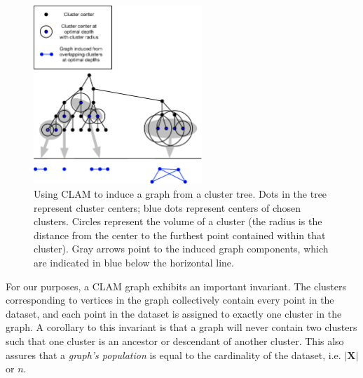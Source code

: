 \begin{figure}[ht!]
    \centering
    \includegraphics[width=2.5in]{images/tree-graph.pdf}
    \caption{Using CLAM to induce a graph from a cluster tree.
        Dots in the tree represent cluster centers;
        blue dots represent centers of chosen clusters.
        Circles represent the volume of a cluster (the radius is the distance from the center to the furthest point contained within that cluster).
        Gray arrows point to the induced graph components, which are indicated in blue below the horizontal line.}
    \label{fig:methods:graph-generation}
\end{figure}

For our purposes, a CLAM graph exhibits an important invariant.
The clusters corresponding to vertices in the graph collectively contain every point in the dataset, and each point in the dataset is assigned to exactly one cluster in the graph.
A corollary to this invariant is that a graph will never contain two clusters such that one cluster is an ancestor or descendant of another cluster.
This also assures that a \textit{graph's population} is equal to the cardinality of the dataset, i.e. $|\textbf{X}|$ or $n$.

